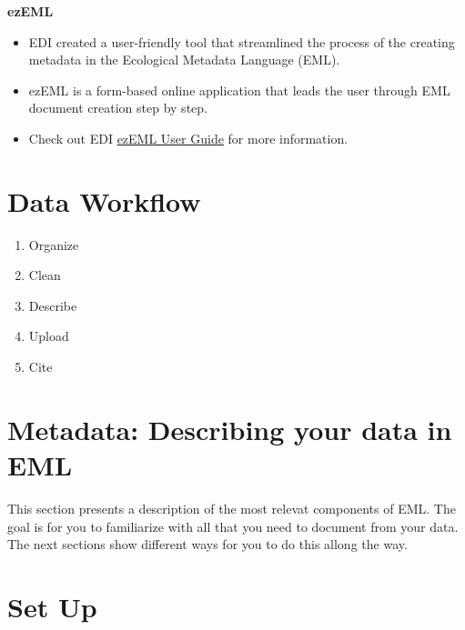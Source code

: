 \documentclass[
  letterpaper,
  DIV=11,
  numbers=noendperiod]{scrreprt}
\providecommand{\tightlist}{%
  \setlength{\itemsep}{0pt}\setlength{\parskip}{0pt}}\usepackage{longtable,booktabs,array}
\begin{document}
\textbf{ezEML}

\begin{itemize}
\item
  EDI created a user-friendly tool that streamlined the process of the
  creating metadata in the Ecological Metadata Language (EML).
\item
  ezEML is a form-based online application that leads the user through
  EML document creation step by step.
\item
  Check out EDI
  \href{https://ezeml.edirepository.org/eml/user_guide}{ezEML User
  Guide} for more information.
\end{itemize}


\hypertarget{data-workflow}{%
\chapter{Data Workflow}\label{data-workflow}}

\begin{enumerate}
\def\labelenumi{\arabic{enumi}.}
\tightlist
\item
  Organize
\item
  Clean
\item
  Describe
\item
  Upload
\item
  Cite
\end{enumerate}


\hypertarget{metadata-describing-your-data-in-eml}{%
\chapter{Metadata: Describing your data in
EML}\label{metadata-describing-your-data-in-eml}}

This section presents a description of the most relevat components of
EML. The goal is for you to familiarize with all that you need to
document from your data. The next sections show different ways for you
to do this allong the way.


\hypertarget{set-up}{%
\chapter*{Set Up}\label{set-up}}

\end{document}
